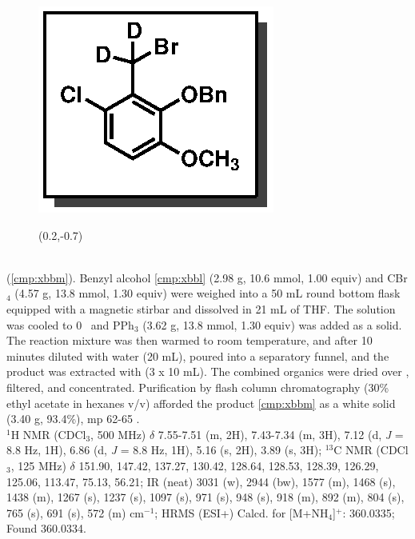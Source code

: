 \vspace{10pt}
\begin{figure}
  \vspace{-25pt}
  \begin{center}
    \includegraphics[scale=0.8]{chp_singlecarbon/images/xbbm}
    \begin{textblock}{1}(0.2,-0.7)  \end{textblock}
  \end{center}
  \vspace{-30pt}
\end{figure}\noindent \textbf{\CMPxbbm}\\ (\ref{cmp:xbbm}). Benzyl alcohol \ref{cmp:xbbl} (2.98
g, 10.6 mmol, 1.00 equiv) and CBr$_4$ (4.57 g, 13.8 mmol, 1.30 equiv) were weighed into a 50 mL
round bottom flask equipped with a magnetic stirbar and dissolved in 21 mL of THF. The
solution was cooled to 0 \degc\  and PPh$_3$ (3.62 g, 13.8 mmol, 1.30 equiv) was added as a solid.
The reaction mixture was then warmed to room temperature, and after 10 minutes diluted with water
(20 mL), poured into a separatory funnel, and the product was extracted with  (3 x 10
mL). The combined organics were dried over , filtered, and concentrated. Purification by
flash column chromatography (30\% ethyl acetate in hexanes v/v) afforded the product \ref{cmp:xbbm}
as a white solid (3.40 g, 93.4\%), mp 62-65 \degc.\\
$^1$H NMR (CDCl$_3$, 500 MHz) $\delta$ 7.55-7.51 (m, 2H), 7.43-7.34 (m, 3H), 7.12 (d, \textit{J} = 8.8 Hz, 1H),
6.86 (d, \textit{J} = 8.8 Hz, 1H), 5.16 (s, 2H), 3.89 (s, 3H); $^{13}$C NMR (CDCl$_3$, 125 MHz) $\delta$ 151.90,
147.42, 137.27, 130.42, 128.64, 128.53, 128.39, 126.29, 125.06, 113.47, 75.13, 56.21; IR (neat)
3031 (w), 2944 (bw), 1577 (m), 1468 (s), 1438 (m), 1267 (s), 1237 (s), 1097 (s), 971 (s), 948 (s),
918 (m), 892 (m), 804 (s), 765 (s), 691 (s), 572 (m) cm$^{-1}$; HRMS (ESI+) Calcd. for
 [M+NH$_4$]$^+$: 360.0335; Found 360.0334.

